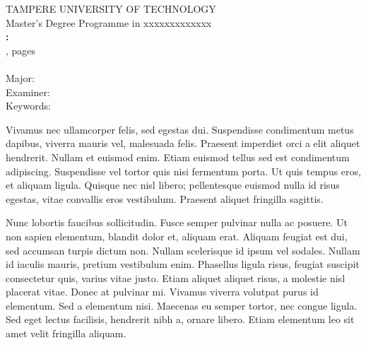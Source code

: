 
\begin{spacing}{1.0}
	\textsf{%
		\MakeUppercase{Tampere University of Technology} \\
		Master's Degree Programme in xxxxxxxxxxxxx \\
		\textbf{\MakeUppercase{\theauthor}: \thetitle} \\
		\documenttype,  pages \\
		\monthyearenglish \\
		Major: \\
		Examiner: \\
		Keywords: }	
\end{spacing}

Vivamus nec ullamcorper felis, sed egestas dui. 
Suspendisse condimentum metus dapibus, viverra mauris vel, malesuada felis. 
Praesent imperdiet orci a elit aliquet hendrerit. Nullam et euismod enim. 
Etiam euismod tellus sed est condimentum adipiscing. 
Suspendisse vel tortor quis nisi fermentum porta. 
Ut quis tempus eros, et aliquam ligula. 
Quisque nec nisl libero; pellentesque euismod nulla id risus egestas, vitae convallis eros vestibulum. 
Praesent aliquet fringilla sagittis.

Nunc lobortis faucibus sollicitudin. 
Fusce semper pulvinar nulla ac posuere. 
Ut non sapien elementum, blandit dolor et, aliquam erat. 
Aliquam feugiat est dui, sed accumsan turpis dictum non. 
Nullam scelerisque id ipsum vel sodales. 
Nullam id iaculis mauris, pretium vestibulum enim.
Phasellus ligula risus, feugiat suscipit consectetur quis, varius vitae justo. 
Etiam aliquet aliquet risus, a molestie nisl placerat vitae. 
Donec at pulvinar mi. Vivamus viverra volutpat purus id elementum. 
Sed a elementum nisi. 
Maecenas eu semper tortor, nec congue ligula. 
Sed eget lectus facilisis, hendrerit nibh a, ornare libero. 
Etiam elementum leo sit amet velit fringilla aliquam.